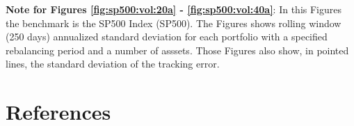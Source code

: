 \documentclass[preprint,authoryear,review,12pt]{elsarticle}
\begin{document}
{\footnotesize
\textbf{Note for Figures \ref{fig:sp500:vol:20a} - \ref{fig:sp500:vol:40a}}:
In this Figures the benchmark is the SP500 Index (SP500).
The Figures shows rolling window (250 days) annualized standard deviation for each portfolio with a specified rebalancing period and a number of asssets.
Those Figures also show, in pointed lines, the standard deviation of the tracking error.}

\clearpage
\section*{References}

\end{document}
